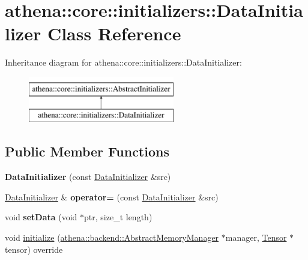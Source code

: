 \hypertarget{classathena_1_1core_1_1initializers_1_1_data_initializer}{}\section{athena\+:\+:core\+:\+:initializers\+:\+:Data\+Initializer Class Reference}
\label{classathena_1_1core_1_1initializers_1_1_data_initializer}
Inheritance diagram for athena\+:\+:core\+:\+:initializers\+:\+:Data\+Initializer\+:\begin{figure}[H]
\begin{center}
\leavevmode
\includegraphics[height=2.000000cm]{d6/d27/classathena_1_1core_1_1initializers_1_1_data_initializer}
\end{center}
\end{figure}
\subsection*{Public Member Functions}
\begin{DoxyCompactItemize}
\item 
\mbox{\label{classathena_1_1core_1_1initializers_1_1_data_initializer_a84b8be47f01caffa74db33ffc254dd43}} 
{\bfseries Data\+Initializer} (const \mbox{\hyperlink{classathena_1_1core_1_1initializers_1_1_data_initializer}{Data\+Initializer}} \&src)
\item 
\mbox{\label{classathena_1_1core_1_1initializers_1_1_data_initializer_abab352c808648db98422d1c436589d9e}} 
\mbox{\hyperlink{classathena_1_1core_1_1initializers_1_1_data_initializer}{Data\+Initializer}} \& {\bfseries operator=} (const \mbox{\hyperlink{classathena_1_1core_1_1initializers_1_1_data_initializer}{Data\+Initializer}} \&src)
\item 
\mbox{\label{classathena_1_1core_1_1initializers_1_1_data_initializer_a9ea7f09748c0ca5dff13607b9076cb39}} 
void {\bfseries set\+Data} (void $\ast$ptr, size\+\_\+t length)
\item 
void \mbox{\hyperlink{classathena_1_1core_1_1initializers_1_1_data_initializer_a984213526b2741e423f230098c71520a}{initialize}} (\mbox{\hyperlink{classathena_1_1backend_1_1_abstract_memory_manager}{athena\+::backend\+::\+Abstract\+Memory\+Manager}} $\ast$manager, \mbox{\hyperlink{classathena_1_1core_1_1_tensor}{Tensor}} $\ast$tensor) override
\end{DoxyCompactItemize}


